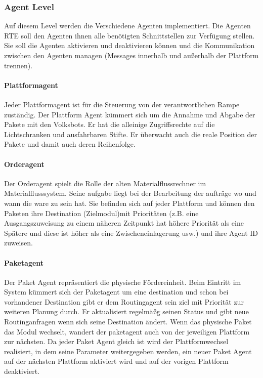 \subsubsection{Agent Level}
Auf diesem Level werden die Verschiedene Agenten implementiert. Die Agenten RTE soll den Agenten ihnen alle benötigten Schnittstellen zur
Verfügung stellen. Sie soll die Agenten aktivieren und deaktivieren können und die Kommunikation zwischen den Agenten managen
(Messages innerhalb und außerhalb der Plattform trennen)\cite[S. 26]{Stasch:Hahn}. 
\paragraph{Plattformagent}
Jeder Plattformagent ist für die Steuerung von der verantwortlichen Rampe zuständig.
Der Plattform Agent kümmert sich um die Annahme und Abgabe der Pakete mit den Volksbots. Er
hat die alleinige Zugriffsrechte auf die Lichtschranken und ausfahrbaren Stifte. Er überwacht auch die reale Position 
der Pakete und damit auch deren Reihenfolge.
\paragraph{Orderagent}
Der Orderagent spielt die Rolle der alten Materialflussrechner im Materialflusssystem. Seine aufgabe liegt bei der Bearbeitung der aufträge
wo und wann die ware zu sein hat. Sie befinden sich auf jeder Plattform und können den Paketen ihre Destination (Zielmodul)mit Prioritäten (z.B.
eine Ausgangszuweisung zu einem näheren Zeitpunkt hat höhere Priorität als eine Spätere und diese ist höher als eine Zwischeneinlagerung usw.) 
und ihre Agent ID zuweisen\cite[S. 30]{Stasch:Hahn}. 
\paragraph{Paketagent}
Der Paket Agent repräsentiert die physische Fördereinheit. Beim Eintritt im System kümmert sich der Paketagent um 
eine destination und schon bei vorhandener Destination gibt er dem Routingagent sein ziel mit Priorität zur weiteren Planung durch.
Er aktualisiert regelmäßg seinen Status und gibt neue Routinganfragen wenn sich seine Destination ändert.
Wenn das physische Paket das Modul wechselt, wandert der paketagent auch von der jeweiligen Plattform zur nächsten. 
Da jeder Paket Agent gleich ist wird der Plattformwechsel realisiert, in dem seine Parameter weitergegeben
werden, ein neuer Paket Agent auf der nächsten Plattform aktiviert wird und auf der vorigen Plattform deaktiviert\cite[S. 31]{Stasch:Hahn}.
